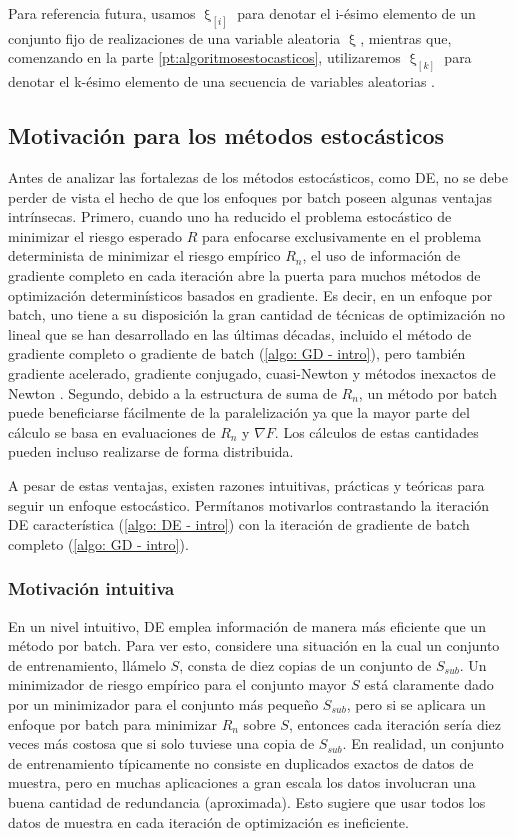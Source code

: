Para referencia futura, usamos $\upxi_{\left [ i \right ]}$ para denotar el i-\'esimo elemento de un conjunto fijo de realizaciones de una variable aleatoria $\upxi$, mientras que, comenzando en la parte \ref{pt:algoritmosestocasticos}, utilizaremos $\upxi_{\left [ k \right ]}$ para denotar el k-\'esimo elemento de una secuencia de variables aleatorias .

\subsection{Motivaci\'on para los m\'etodos estoc\'asticos}
Antes de analizar las fortalezas de los m\'etodos estoc\'asticos, como DE, no se debe perder de vista el hecho de que los enfoques por batch poseen algunas ventajas intr\'insecas. Primero, cuando uno ha reducido el problema estoc\'astico de minimizar el riesgo esperado $R$ para enfocarse exclusivamente en el problema determinista de minimizar el riesgo emp\'irico $R_n$, el uso de informaci\'on de gradiente completo en cada iteraci\'on abre la puerta para muchos m\'etodos de optimizaci\'on determin\'isticos basados en gradiente. Es decir, en un enfoque por batch, uno tiene a su disposici\'on la gran cantidad de t\'ecnicas de optimizaci\'on no lineal que se han desarrollado en las \'ultimas d\'ecadas, incluido el m\'etodo de gradiente completo o gradiente de batch (\ref{algo: GD - intro}), pero tambi\'en gradiente acelerado, gradiente conjugado, cuasi-Newton y m\'etodos inexactos de Newton \cite{nocedal:2006}. Segundo, debido a la estructura de suma de $R_n$, un m\'etodo por batch puede beneficiarse f\'acilmente de la paralelizaci\'on ya que la mayor parte del c\'alculo se basa en evaluaciones de $R_n$ y $\nabla F$. Los c\'alculos de estas cantidades pueden incluso realizarse de forma distribuida.

A pesar de estas ventajas, existen razones intuitivas, pr\'acticas y te\'oricas para seguir un enfoque estoc\'astico. Perm\'itanos motivarlos contrastando la iteraci\'on DE caracter\'istica (\ref{algo: DE - intro}) con la iteraci\'on de gradiente de batch completo (\ref{algo: GD - intro}).

\subsubsection{Motivación intuitiva}

En un nivel intuitivo, DE emplea información de manera más eficiente que un método por batch. Para ver esto, considere una situación en la cual un conjunto de entrenamiento, llámelo $S$, consta de diez copias de un conjunto de $S_{sub}$. Un minimizador de riesgo empírico para el conjunto mayor $S$ está claramente dado por un minimizador para el conjunto más pequeño $S_{sub}$, pero si se aplicara un enfoque por batch para minimizar $R_n$ sobre $S$, entonces cada iteración sería diez veces más costosa que si solo tuviese una copia de $S_{sub}$. En realidad, un conjunto de entrenamiento típicamente no consiste en duplicados exactos de datos de muestra, pero en muchas aplicaciones a gran escala los datos involucran una buena cantidad de redundancia (aproximada). Esto sugiere que usar todos los datos de muestra en cada iteración de optimización es ineficiente.

